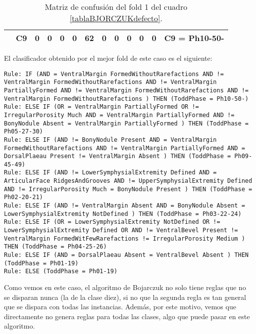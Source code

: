 \begin{table}[H]
{\begin{tabular}{|ccccccccccccc|}
\multicolumn{1}{|c|}{}                                      & \multicolumn{1}{c|}{C9} & \multicolumn{1}{c|}{0}  & \multicolumn{1}{c|}{0}  & \multicolumn{1}{c|}{0}  & \multicolumn{1}{c|}{0}  & \multicolumn{1}{c|}{\textbf{62}}  & \multicolumn{1}{c|}{0}  & \multicolumn{1}{c|}{0}  & \multicolumn{1}{c|}{0}  & \multicolumn{1}{c|}{0}  & \multicolumn{1}{c|}{0} & C9 = Ph10-50-     \\ \hline
\end{tabular}%
}
\caption{Matriz de confusión del fold 1 del cuadro \ref{tablaBJORCZUKdefecto}.}
\end{table}



El clasificador obtenido por el mejor fold de este caso es el siguiente:

\begin{lstlisting}
Rule: IF (AND = VentralMargin FormedWithoutRarefactions AND != VentralMargin FormedWithoutRarefactions AND != VentralMargin PartiallyFormed AND != VentralMargin FormedWithoutRarefactions AND != VentralMargin FormedWithoutRarefactions ) THEN (ToddPhase = Ph10-50-)
Rule: ELSE IF (OR = VentralMargin PartiallyFormed OR != IrregularPorosity Much AND = VentralMargin PartiallyFormed AND != BonyNodule Absent = VentralMargin PartiallyFormed ) THEN (ToddPhase = Ph05-27-30)
Rule: ELSE IF (AND != BonyNodule Present AND = VentralMargin FormedWithoutRarefactions AND != VentralMargin PartiallyFormed AND = DorsalPlaeau Present != VentralMargin Absent ) THEN (ToddPhase = Ph09-45-49)
Rule: ELSE IF (AND != LowerSymphysialExtremity Defined AND = ArticularFace RidgesAndGrooves AND != UpperSymphysialExtremity Defined AND != IrregularPorosity Much = BonyNodule Present ) THEN (ToddPhase = Ph02-20-21)
Rule: ELSE IF (AND != VentralMargin Absent AND = BonyNodule Absent = LowerSymphysialExtremity NotDefined ) THEN (ToddPhase = Ph03-22-24)
Rule: ELSE IF (OR = LowerSymphysialExtremity NotDefined OR != LowerSymphysialExtremity Defined OR AND != VentralBevel Present != VentralMargin FormedWitFewRarefactions != IrregularPorosity Medium ) THEN (ToddPhase = Ph04-25-26)
Rule: ELSE IF (AND = DorsalPlaeau Absent = VentralBevel Absent ) THEN (ToddPhase = Ph01-19)
Rule: ELSE (ToddPhase = Ph01-19)
\end{lstlisting}

Como vemos en este caso, el algoritmo de Bojarczuk no solo tiene reglas que no se disparan nunca (la de la clase diez), si no que la segunda regla es tan general que se dispara con todas las instancias. Además, por este motivo, vemos que directamente no genera reglas para todas las clases, algo que puede pasar en este algoritmo.

